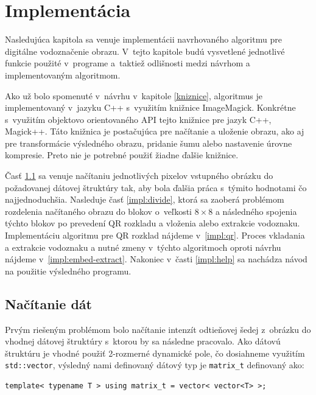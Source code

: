 \chapter{Implementácia}
\label{ch-impl}
Nasledujúca kapitola sa venuje implementácii navrhovaného algoritmu pre digitálne vodoznačenie obrazu. V~tejto kapitole budú vysvetlené jednotlivé funkcie použité v~programe a~taktiež odlišnosti medzi návrhom a implementovaným algoritmom.

Ako už bolo spomenuté v~návrhu v~kapitole \ref{kniznice}, algoritmus je implementovaný v~jazyku C++ s~využitím knižnice ImageMagick. Konkrétne s~využitím objektovo orientovaného API tejto knižnice pre jazyk C++, Magick++. Táto knižnica je postačujúca pre načítanie a uloženie obrazu, ako aj pre transformácie výsledného obrazu, pridanie šumu alebo nastavenie úrovne kompresie. Preto nie je potrebné použiť žiadne ďalšie knižnice.

Časť \ref{impl:load} sa venuje načítaniu jednotlivých pixelov vstupného obrázku do požadovanej dátovej štruktúry tak, aby bola ďalšia práca s~týmito hodnotami čo najjednoduchšia. Nasleduje časť \ref{impl:divide}, ktorá sa zaoberá problémom rozdelenia načítaného obrazu do blokov o~veľkosti $8\times8$ a následného spojenia týchto blokov po prevedení QR rozkladu a vloženia alebo extrakcie vodoznaku. Implementáciu algoritmu pre QR rozklad nájdeme v~\ref{impl:qr}. Proces vkladania a extrakcie vodoznaku a nutné zmeny v~týchto algoritmoch oproti návrhu nájdeme v~\ref{impl:embed-extract}. Nakoniec v~časti \ref{impl:help} sa nachádza návod na použitie výsledného programu.

\section{Načítanie dát}
\label{impl:load}
Prvým riešeným problémom bolo načítanie intenzít odtieňovej šedej z~obrázku do vhodnej dátovej štruktúry s~ktorou by sa následne pracovalo. Ako dátovú štruktúru je vhodné použiť 2-rozmerné dynamické pole, čo dosiahneme využitím {\tt std::vector}, výsledný nami definovaný dátový typ je {\tt matrix\_t} definovaný ako:

\begin{lstlisting}
template< typename T > using matrix_t = vector< vector<T> >;
\end{lstlisting}

